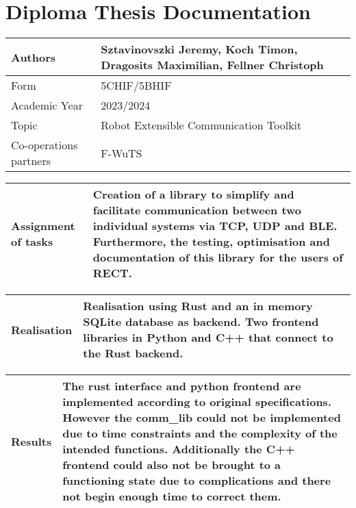 \chapter{Diploma Thesis Documentation}
\begin{center}
    \begin{tabular}{| m{8cm} | m{8cm} |}
        \hline
        Authors & Sztavinovszki Jeremy, Koch Timon, Dragosits Maximilian, Fellner Christoph\\
        \hline
        Form & 5CHIF/5BHIF\\
        Academic Year & 2023/2024\\
        \hline
        Topic & Robot Extensible Communication Toolkit\\
        \hline
        Co-operations partners & F-WuTS\\
        \hline
    \end{tabular}
    
    \vspace{5mm}
    
    \begin{tabular}{| m{8cm} | m{8cm} |}
        \hline
        Assignment of tasks & Creation of a library to simplify and facilitate communication between two individual systems via TCP, UDP and BLE. Furthermore, the testing, optimisation and documentation of this library for the users of RECT.\\ %
        \hline
    \end{tabular}
    
    \vspace{5mm}
    
    \begin{tabular}{| m{8cm} | m{8cm} |}
        \hline
        Realisation & Realisation using Rust and an in memory SQLite database as backend. Two frontend libraries in Python and C++ that connect to the Rust backend.\\ %
        \hline
    \end{tabular}
    
    \vspace{5mm}
    
    \begin{tabular}{| m{8cm} | m{8cm} |}
        \hline
        Results & The rust interface and python frontend are implemented according to original specifications. However the comm\_lib could not be implemented due to time constraints and the complexity of the intended functions. Additionally the C++ frontend could also not be brought to a functioning state due to complications and there not begin enough time to correct them.\\ %
        \hline
    \end{tabular}
    

\end{center}
